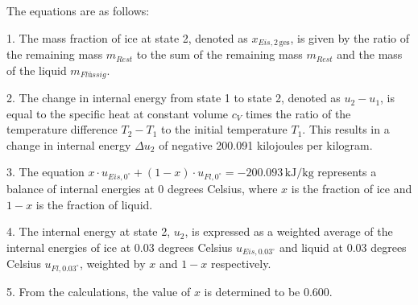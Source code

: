 The equations are as follows:

1. The mass fraction of ice at state 2, denoted as \( x_{Eis,2 \, \text{ges}} \), is given by the ratio of the remaining mass \( m_{Rest} \) to the sum of the remaining mass \( m_{Rest} \) and the mass of the liquid \( m_{Flüssig} \).

2. The change in internal energy from state 1 to state 2, denoted as \( u_2 - u_1 \), is equal to the specific heat at constant volume \( c_V \) times the ratio of the temperature difference \( T_2 - T_1 \) to the initial temperature \( T_1 \). This results in a change in internal energy \( \Delta u_2 \) of negative 200.091 kilojoules per kilogram.

3. The equation \( x \cdot u_{Eis,0^\circ} + (1 - x) \cdot u_{Fl,0^\circ} = -200.093 \, \text{kJ/kg} \) represents a balance of internal energies at 0 degrees Celsius, where \( x \) is the fraction of ice and \( 1-x \) is the fraction of liquid.

4. The internal energy at state 2, \( u_2 \), is expressed as a weighted average of the internal energies of ice at 0.03 degrees Celsius \( u_{Eis,0.03^\circ} \) and liquid at 0.03 degrees Celsius \( u_{Fl,0.03^\circ} \), weighted by \( x \) and \( 1-x \) respectively.

5. From the calculations, the value of \( x \) is determined to be 0.600.